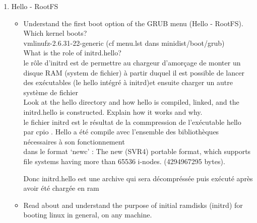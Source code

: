 \documentclass[10]{article}
\begin{document}
\begin{enumerate}
\begin{itemize}
\item Read about and understand the GRUB process and how it is installed on a disk and the GRUB boot stages.

Sur le disque il faut sur le MBR le stage 1 ()
ensuite on  place le Stage 1.5 pour que certains driver sp\'ecifique soit charg\'es si n\'ecessaire.  ( dans les 30 kilooctets suivant le MBR).
Stage 1 charge Stage 1.5 si il est pr\'esent sinon il charge Stage 2.La partie 1.5 peut contenir des pilotes pour pouvoir acc\'eder \`a la partie 2.
Stage 1.5 charge  Stage 2 qui est plac\'e sur . 


\item Read about and understand the GRUB menu given to you.\\




\end{itemize}

\item Hello - RootFS
\begin{itemize}
\item Understand the first boot option of the GRUB menu (Hello - RootFS).
Which kernel boots? \\
vmlinufz-2.6.31-22-generic (cf menu.lst dans minidist/boot/grub)\\
What is the role of initrd.hello? \\
le r\^ole d'initrd est de permettre au chargeur d'amor\c cage de monter un disque RAM (system de fichier) \`a partir duquel il est possible de lancer des ex\'ecutables (le hello int\'egr\'e \`a initrd)et ensuite charger un autre syst\`eme de fichier\\

Look at the hello directory and how hello is compiled, linked, and the initrd.hello is constructed. 
Explain how it works and why.\\

le fichier initrd est le r\'esultat de la commpression de l'ex\'ecutable hello par cpio .
Hello a \'et\'e compile avec l'ensemble des biblioth\`eques n\'ecessaires \`a son  fonctionnement \\
dans le format ‘newc’ :
    The new (SVR4) portable format, which supports file systems having more than 65536 i-nodes. (4294967295 bytes).
    
Donc initrd.hello est une archive qui sera d\'ecompr\'ess\'ee puis ex\'ecut\'e apr\`es avoir \'et\'e charg\'ee en ram\\


\item Read about and understand the purpose of initial ramdisks (initrd)
for booting linux in general, on any machine.
\end{itemize}


\end{enumerate}
\end{document}
